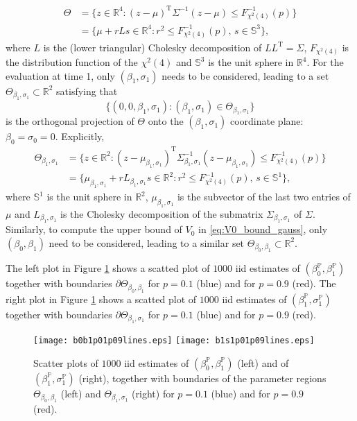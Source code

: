 \documentclass[11pt,a4paper]{article}
\newcommand{\trans}{{\mathrm{T}}}
\renewcommand{\P}{\mathbb{P}}
\newcommand{\R}{\mathbb{R}}
\begin{document}
\begin{align*}
\Theta&=\Big\{z\in\R^4:(z-\mu)^{\trans}\Sigma^{-1}(z-\mu)\leq F_{\chi^2(4)}^{-1}(p)\Big\}\\
&=\Big\{\mu+rLs\in\R^4:r^2\leq F_{\chi^2(4)}^{-1}(p),\,s\in\mathbb{S}^3\Big\},
\end{align*}  
where $L$ is the (lower triangular) Cholesky decomposition of $LL^{\trans}=\Sigma$, $F_{\chi^2(4)}$ is the distribution function of the $\chi^2(4)$ and $\mathbb{S}^3$ is the unit sphere in $\R^4$. For the evaluation at time 1, only $(\beta_1, \sigma_1)$ needs to be considered, leading to a set $\Theta_{\beta_1,\sigma_1}\subset \R^2$ satisfying that 
$$
\{(0,0,\beta_1,\sigma_1):(\beta_1,\sigma_1)\in \Theta_{\beta_1,\sigma_1}\}
$$ 
is the orthogonal projection of $\Theta$ onto the $(\beta_1, \sigma_1)$ coordinate plane: $\beta_0=\sigma_0=0$. Explicitly, 
\begin{align*}
\Theta_{\beta_1,\sigma_1}&=\Big\{z\in\R^2:(z-\mu_{\beta_1,\sigma_1})^{\trans}\Sigma_{\beta_1,\sigma_1}^{-1}(z-\mu_{\beta_1,\sigma_1})\leq F_{\chi^2(4)}^{-1}(p)\Big\}\\
&=\Big\{\mu_{\beta_1,\sigma_1}+rL_{\beta_1,\sigma_1}s\in\R^2:r^2\leq F_{\chi^2(4)}^{-1}(p),\,s\in\mathbb{S}^1\Big\},
\end{align*}
where $\mathbb{S}^1$ is the unit sphere in $\R^2$, $\mu_{\beta_1,\sigma_1}$ is the subvector of the last two entries of $\mu$ and $L_{\beta_1,\sigma_1}$ is the Cholesky decomposition of the submatrix $\Sigma_{\beta_1,\sigma_1}$ of $\Sigma$. 
Similarly, to compute the upper bound of $V_0$ in \eqref{eq:V0_bound_gauss}, only $(\beta_0, \beta_1)$ need to be considered, leading to a similar set $\Theta_{\beta_0,\beta_1}\subset \R^2$.  

The left plot in Figure \ref{fig:scatter_parameterestimates} shows a scatted plot of $1000$ iid estimates of $(\beta_0^{\P},\beta_1^{\P})$ together with boundaries $\partial \Theta_{\beta_0,\beta_1}$ for $p=0.1$ (blue) and for $p=0.9$ (red). 
 The right plot in Figure \ref{fig:scatter_parameterestimates} shows a scatted plot of $1000$ iid estimates of $(\beta_1^{\P},\sigma_1^{\P})$ together with boundaries $\partial \Theta_{\beta_1,\sigma_1}$ for $p=0.1$ (blue) and for $p=0.9$ (red). 

\begin{figure}[ht]\center
\texttt{[image: b0b1p01p09lines.eps]}
\texttt{[image: b1s1p01p09lines.eps]}
\caption{Scatter plots of $1000$ iid estimates of $(\beta_0^{\P},\beta_1^{\P})$ (left) and of $(\beta_1^{\P},\sigma_1^{\P})$ (right), together with boundaries of the parameter regions $\Theta_{\beta_0,\beta_1}$ (left) and $\Theta_{\beta_1,\sigma_1}$ (right) for $p=0.1$ (blue) and for $p=0.9$ (red).}
\label{fig:scatter_parameterestimates}
\end{figure}
\end{document}
